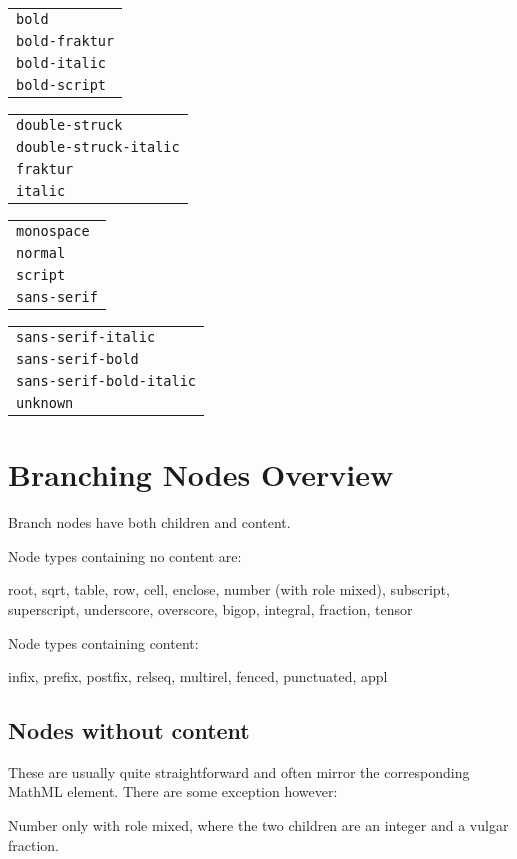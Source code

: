 \documentclass{article}
\begin{document}
\noindent
\begin{tabular}{>{\tt}l}
  bold\\
  bold-fraktur\\
  bold-italic\\
  bold-script
\end{tabular}\quad
\begin{tabular}{>{\tt}l}
  double-struck\\
  double-struck-italic\\
  fraktur\\
  italic\\
\end{tabular}\quad
\begin{tabular}{>{\tt}l}
  monospace\\
  normal\\
  script\\
  sans-serif\\
\end{tabular}\quad
\begin{tabular}{>{\tt}l}
  sans-serif-italic\\
  sans-serif-bold\\
  sans-serif-bold-italic\\
  unknown
\end{tabular}

\section{Branching Nodes Overview}
\label{sec:branching-nodes-overview}

Branch nodes have both children and content. 

Node types containing no content are: 

root, sqrt, table, row, cell, enclose, number (with role mixed), subscript,
superscript, underscore, overscore, bigop, integral, fraction, tensor

Node types containing content: 

infix, prefix, postfix, relseq, multirel, fenced, punctuated, appl

\subsection{Nodes without content}

These are usually quite straightforward and often mirror the corresponding
MathML element. There are some exception however: 

Number only with role mixed, where the two children are an integer and a vulgar
fraction.
\end{document}
